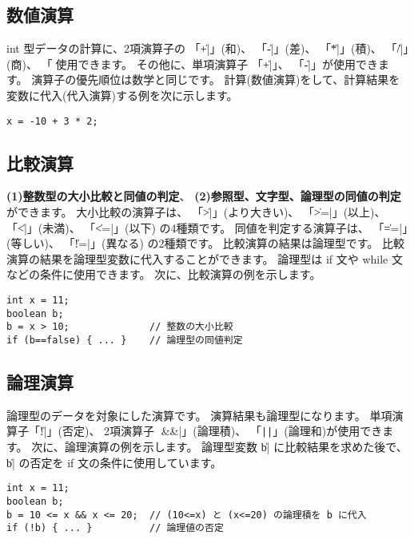 \subsection{数値演算}

int 型データの計算に、2項演算子の
「\|+|」(和)、
「\|-|」(差)、
「\|*|」(積)、
「\|/|」(商)、
「\|%
が使用できます。
その他に、単項演算子
「\|+|」、
「\|-|」が使用できます。
演算子の優先順位は数学と同じです。
計算(数値演算)をして、計算結果を変数に代入(代入演算)する例を次に示します。

\begin{mylist}
\begin{verbatim}
x = -10 + 3 * 2;
\end{verbatim}
\end{mylist}

\subsection{比較演算}

{\bf (1)整数型の大小比較と同値の判定}、
{\bf (2)参照型、文字型、論理型の同値の判定}ができます。
大小比較の演算子は、
「\|>|」(より大きい)、
「\|>=|」(以上)、
「\|<|」(未満)、
「\|<=|」(以下) の4種類です。
同値を判定する演算子は、
「\|==|」(等しい)、
「\|!=|」(異なる)
の2種類です。
比較演算の結果は論理型です。
比較演算の結果を論理型変数に代入することができます。
論理型は if 文や while 文などの条件に使用できます。
次に、比較演算の例を示します。

\begin{mylist}
\begin{verbatim}
int x = 11;
boolean b;
b = x > 10;              // 整数の大小比較
if (b==false) { ... }    // 論理型の同値判定
\end{verbatim}
\end{mylist}

\subsection{論理演算}

論理型のデータを対象にした演算です。
演算結果も論理型になります。
単項演算子「\|!|」(否定)、
2項演算子
「\|&&|」(論理積)、
「\verb/||/」(論理和)が使用できます。
次に、論理演算の例を示します。
論理型変数 \|b| に比較結果を求めた後で、
\|b| の否定を if 文の条件に使用しています。

\begin{mylist}
\begin{verbatim}
int x = 11;
boolean b;
b = 10 <= x && x <= 20;  // (10<=x) と (x<=20) の論理積を b に代入
if (!b) { ... }          // 論理値の否定
\end{verbatim}
\end{mylist}

